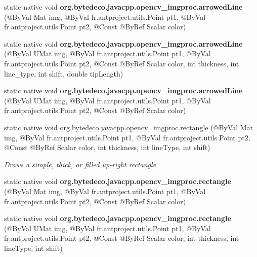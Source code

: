 \begin{DoxyCompactItemize}
\mbox{\label{group__imgproc__draw_gac9b6e58c7decc1c1db29c7047dfb4ef0}} 
static native void {\bfseries org.\+bytedeco.\+javacpp.\+opencv\+\_\+imgproc.\+arrowed\+Line} (@By\+Val Mat img, @By\+Val fr.antproject.utils.Point pt1, @By\+Val fr.antproject.utils.Point pt2, @Const @By\+Ref Scalar color)
\item 
\mbox{\label{group__imgproc__draw_ga02af158e1edeb4ea5a3e2ac42f228bfc}} 
static native void {\bfseries org.\+bytedeco.\+javacpp.\+opencv\+\_\+imgproc.\+arrowed\+Line} (@By\+Val U\+Mat img, @By\+Val fr.antproject.utils.Point pt1, @By\+Val fr.antproject.utils.Point pt2, @Const @By\+Ref Scalar color, int thickness, int line\+\_\+type, int shift, double tip\+Length)
\item 
\mbox{\label{group__imgproc__draw_ga101f9afb4d23576b498eb89905b4c24e}} 
static native void {\bfseries org.\+bytedeco.\+javacpp.\+opencv\+\_\+imgproc.\+arrowed\+Line} (@By\+Val U\+Mat img, @By\+Val fr.antproject.utils.Point pt1, @By\+Val fr.antproject.utils.Point pt2, @Const @By\+Ref Scalar color)
\item 
static native void \hyperlink{group__imgproc__draw_ga011e780e69d07eab5e5e6ac46d4d8dde}{org.\+bytedeco.\+javacpp.\+opencv\+\_\+imgproc.\+rectangle} (@By\+Val Mat img, @By\+Val fr.antproject.utils.Point pt1, @By\+Val fr.antproject.utils.Point pt2, @Const @By\+Ref Scalar color, int thickness, int line\+Type, int shift)
\begin{DoxyCompactList}\small\item\em Draws a simple, thick, or filled up-\/right rectangle. \end{DoxyCompactList}\item 
\mbox{\label{group__imgproc__draw_ga6ee4b8e571d2f2ebbb100a854ecb2818}} 
static native void {\bfseries org.\+bytedeco.\+javacpp.\+opencv\+\_\+imgproc.\+rectangle} (@By\+Val Mat img, @By\+Val fr.antproject.utils.Point pt1, @By\+Val fr.antproject.utils.Point pt2, @Const @By\+Ref Scalar color)
\item 
\mbox{\label{group__imgproc__draw_ga19fb1bab5b4e8ff022135aa967a84c3b}} 
static native void {\bfseries org.\+bytedeco.\+javacpp.\+opencv\+\_\+imgproc.\+rectangle} (@By\+Val U\+Mat img, @By\+Val fr.antproject.utils.Point pt1, @By\+Val fr.antproject.utils.Point pt2, @Const @By\+Ref Scalar color, int thickness, int line\+Type, int shift)

\end{DoxyCompactItemize}
